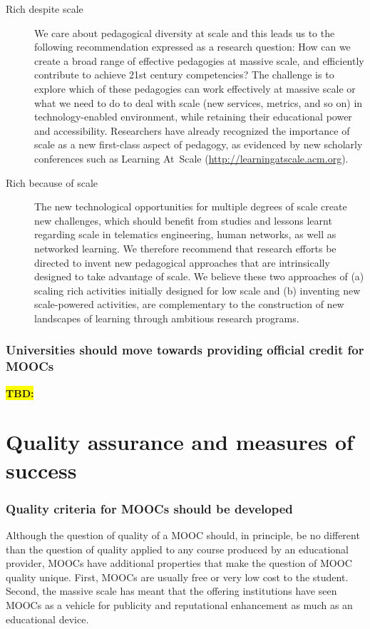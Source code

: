 \documentclass[a4paper,UKenglish]{dagman}
\newcommand{\tbd}[1]{{\colorbox{yellow}{\color{red} \textbf{TBD:} \protect{#1}}}}
\begin{document}
\begin{description}
\item[Rich despite scale] We care about pedagogical diversity at scale and this leads us to the
  following recommendation expressed as a research question: How can we create a broad range of
  effective pedagogies at massive scale, and efficiently contribute to achieve 21st century
  competencies? The challenge is to explore which of these pedagogies can work effectively at
  massive scale or what we need to do to deal with scale (new services, metrics, and so on) in
  technology-enabled environment, while retaining their educational power and accessibility.
  Researchers have already recognized the importance of scale as a new first-class aspect of
  pedagogy, as evidenced by new scholarly conferences such as Learning At~Scale
  (\url{http://learningatscale.acm.org}).
\item[Rich because of scale] The new technological opportunities for multiple degrees of scale
  create new challenges, which should benefit from studies and lessons learnt regarding scale in
  telematics engineering, human networks, as well as networked learning. We therefore recommend that
  research efforts be directed to invent new pedagogical approaches that are intrinsically designed
  to take advantage of scale. We believe these two approaches of (a) scaling rich activities
  initially designed for low scale and (b) inventing new scale-powered activities, are complementary
  to the construction of new landscapes of learning through ambitious research programs.
\end{description}

\subsubsection*{Universities should move towards providing official credit for MOOCs}

\tbd{XX}


\section{Quality assurance and measures of success}

\subsubsection*{Quality criteria for MOOCs should be developed}
Although the question of quality of a MOOC should, in principle, be no different than the question
of quality applied to any course produced by an educational provider, MOOCs have additional
properties that make the question of MOOC quality unique. First, MOOCs are usually free or very low
cost to the student. Second, the massive scale has meant that the offering institutions have seen
MOOCs as a vehicle for publicity and reputational enhancement as much as an educational device.
\end{document}
